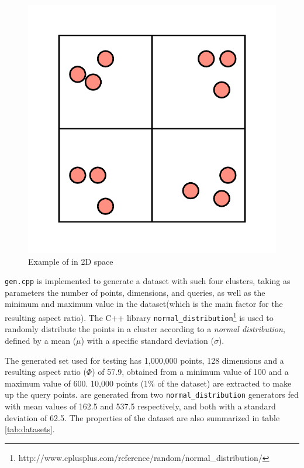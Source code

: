 \begin{figure}[h]
	\centering
	\includegraphics[scale=0.5]{figures/Clusters_example.png}
	\caption{Example of \clust{} in 2D space}
	\label{fig:clusters}
\end{figure}


\texttt{gen.cpp} is implemented to generate a dataset with such four clusters, taking as parameters the number of points, dimensions, and queries, as well as the minimum and maximum value in the dataset(which is the main factor for the resulting aspect ratio). The C++ library \texttt{normal\_distribution}\footnote{http://www.cplusplus.com/reference/random/normal\_distribution/} is used to randomly distribute the points in a cluster according to a \textit{normal distribution}, defined by a mean ($\mu$) with a specific standard deviation ($\sigma$). 

The generated set used for testing has 1,000,000 points, 128 dimensions and a resulting aspect ratio ($\Phi$) of 57.9, obtained from a minimum value of 100 and a maximum value of 600. 10,000 points (1\% of the dataset) are extracted to make up the query points. \clust{} are generated from two \texttt{normal\_distribution} generators fed with mean values of 162.5 and 537.5 respectively, and both with a standard deviation of 62.5. The properties of the dataset are also summarized in table \ref{tab:datasets}.